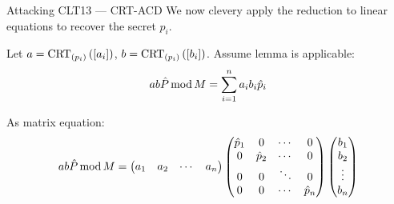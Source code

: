 \documentclass[english]{beamer}
\begin{document}
    \begin{frame}{Attacking CLT13 --- CRT-ACD}
        We now clevery apply the reduction to linear equations to recover the secret $p_i$.

        Let $a = \operatorname{CRT}_{(p_{i})}\left(\left[a_i\right]\right)$, $b = \operatorname{CRT}_{(p_{i})}\left(\left[b_i\right]\right)$. Assume lemma is applicable:
        \begin{equation*}
            ab\hat{P} \operatorname{mod} M = \sum_{i=1}^n a_i b_i \hat{p}_i
        \end{equation*}
        \pause

        As matrix equation:
        \begin{equation*}
            ab\hat{P} \operatorname{mod} M =
            \begin{pmatrix}
                a_1 & a_2 & \cdots & a_n
            \end{pmatrix}
            \begin{pmatrix}
                \hat{p}_1 & 0 & \cdots & 0 \\
                0 & \hat{p}_2 & \cdots & 0 \\
                0 & 0 & \ddots & 0 \\
                0 & 0 & \cdots & \hat{p}_n
            \end{pmatrix}
            \begin{pmatrix}
                b_1 \\
                b_2 \\
                \vdots \\
                b_n
            \end{pmatrix}
        \end{equation*}
    \end{frame}
\end{document}
